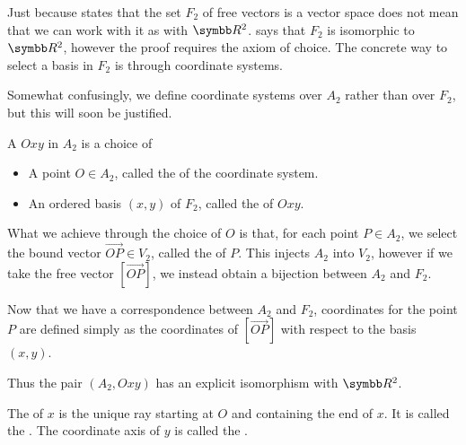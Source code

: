 \begin{definition}\label{def:euclidean_plane_coordinate_system}
  Just because  states that the set \( F_2 \) of free vectors is a vector space does not mean that we can work with it as with \( \BR^2 \).  says that \( F_2 \) is isomorphic to \( \BR^2 \), however the proof requires the axiom of choice. The concrete way to select a basis in \( F_2 \) is through coordinate systems.

  Somewhat confusingly, we define coordinate systems over \( A_2 \) rather than over \( F_2 \), but this will soon be justified.

  A  \( Oxy \) in \( A_2 \) is a choice of
  \begin{itemize}
    \item A point \( O \in A_2 \), called the  of the coordinate system.
    \item An ordered basis \( (x, y) \) of \( F_2 \), called the  of \( Oxy \).
  \end{itemize}

  What we achieve through the choice of \( O \) is that, for each point \( P \in A_2 \), we select the bound vector \( \Vec{OP} \in V_2 \), called the  of \( P \). This injects \( A_2 \) into \( V_2 \), however if we take the free vector \( [\Vec{OP}] \), we instead obtain a bijection between \( A_2 \) and \( F_2 \).

  Now that we have a correspondence between \( A_2 \) and \( F_2 \), coordinates for the point \( P \) are defined simply as the coordinates of \( [\Vec{OP}] \) with respect to the basis \( (x, y) \).

  Thus the pair \( (A_2, Oxy) \) has an explicit isomorphism with \( \BR^2 \).

  The  of \( x \) is the unique ray starting at \( O \) and containing the end of \( x \). It is called the . The coordinate axis of \( y \) is called the .
\end{definition}

